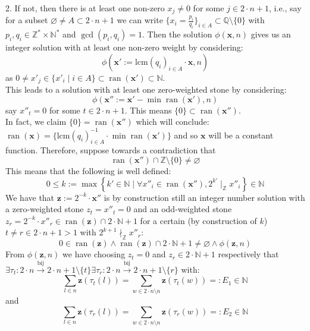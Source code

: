 \documentclass[11pt, a4paper, oneside]{article}
\theoremstyle{remark}
\theoremstyle{lemma}
\begin{document}
2. If not, then there is at least one non-zero $x_j \neq 0$ for some $j \in 2 \cdot n + 1$, i.e., say for a subset $\varnothing \neq A \subset 2 \cdot n + 1$ we can write $\{x_i = \frac{p_i}{q_i}\}_{i \in A} \subset \mathbb{Q} \setminus \{0\}$ with $p_i, q_i \in \mathbb{Z}^{*} \times \mathbb{N}^{*}$ and $\gcd(p_i, q_i) = 1$. Then the solution $\phi(\mathbf{x}, n)$ gives us an integer solution with at least one non-zero weight by considering:
$$
\phi(\mathbf{x}':= \text{lcm}(q_i)_{i \in A} \cdot \mathbf{x}, n)
$$
as $0 \neq x'_j \in \{x'_i \mid i \in A\} \subset \operatorname{ran}(\mathbf{x}') \subset \mathbb{N}$.
\\
This leads to a solution with at least one zero-weighted stone by considering:
$$
\phi(\mathbf{x}'' := \mathbf{x}' - \min \operatorname{ran}(\mathbf{x}'), n)
$$
say $x''_t = 0$ for some $t \in 2 \cdot n + 1$. This means $\{0\} \subset \operatorname{ran}(\mathbf{x}'')$.
\\
In fact, we claim $\{0\} = \operatorname{ran}(\mathbf{x}'')$ which will conclude: $\operatorname{ran}(\mathbf{x}) = \{\text{lcm}(q_i)_{i \in A}^{-1} \cdot \min \operatorname{ran}(\mathbf{x}')\}$ and so $\mathbf{x}$ will be a constant function. Therefore, suppose towards a contradiction that
$$
\operatorname{ran}(\mathbf{x}'') \cap \mathbb{Z} \setminus \{0\} \neq \varnothing
$$
This means that the following is well defined:
$$
0 \leq k := \max \left\{ k' \in \mathbb{N} \mid \forall x''_i \in \operatorname{ran}(\mathbf{x}''), 2^{k'} \mid_{\mathbb{Z}} x''_i \right\} \in \mathbb{N}
$$
We have that $\mathbf{z} := 2^{-k} \cdot \mathbf{x}''$ is by construction still an integer number solution with a zero-weighted stone $z_t = x''_t = 0$ and an odd-weighted stone $z_r = 2^{-k} \cdot x''_r \in \operatorname{ran}(\mathbf{z}) \cap 2 \cdot \mathbb{N} + 1$ for a certain (by construction of $k$) $t \neq r \in 2 \cdot n + 1 > 1$ with $2^{k+1} \nmid_{\mathbb{Z}} x''_r$:
$$
0 \in \operatorname{ran}(\mathbf{z}) \wedge \operatorname{ran}(\mathbf{z}) \cap 2 \cdot \mathbb{N} + 1 \neq \varnothing \wedge \phi(\mathbf{z}, n)
$$
From $\phi(\mathbf{z}, n)$ we have choosing $z_t = 0$ and $z_r \in 2 \cdot \mathbb{N} + 1$ respectively that $\exists \tau_t: 2 \cdot n \overset{\text{bij}}{\rightarrow} 2 \cdot n + 1 \setminus \{t\} \exists \tau_r: 2 \cdot n \overset{\text{bij}}{\rightarrow} 2 \cdot n + 1 \setminus \{r\}$ with:
$$
\sum_{l \in n} \mathbf{z}(\tau_t(l)) = \sum_{w \in 2 \cdot n \setminus n} \mathbf{z}(\tau_t(w)) =: E_1 \in \mathbb{N}
$$
and
$$
\sum_{l \in n} \mathbf{z}(\tau_r(l)) = \sum_{w \in 2 \cdot n \setminus n} \mathbf{z}(\tau_r(w)) =: E_2 \in \mathbb{N}
$$
\end{document}
